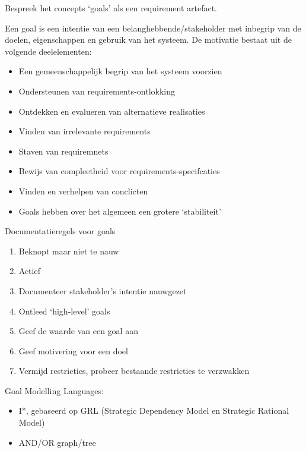 \documentclass{article}
\begin{document}
\begin{quest}{}Bespreek het concepts `goals' als een requirement artefact.\end{quest}
Een goal is een intentie van een belanghebbende/stakeholder met inbegrip van de doelen, eigenschappen en gebruik van het systeem. De motivatie bestaat uit de volgende deelelementen:
\begin{itemize}
    \item Een gemeenschappelijk begrip van het systeem voorzien
    \item Ondersteunen van requirements-ontlokking
    \item Ontdekken en evalueren van alternatieve realisaties
    \item Vinden van irrelevante requirements
    \item Staven van requiremnets
    \item Bewijs van compleetheid voor requirements-specifcaties
    \item Vinden en verhelpen van conclicten
    \item Goals hebben over het algemeen een grotere `stabiliteit'
\end{itemize}
Documentatieregels voor goals
\begin{enumerate}
    \item Beknopt maar niet te nauw
    \item Actief
    \item Documenteer stakeholder's intentie nauwgezet
    \item Ontleed `high-level' goals
    \item Geef de waarde van een goal aan
    \item Geef motivering voor een doel
    \item Vermijd restricties, probeer bestaande restricties te verzwakken
\end{enumerate}
Goal Modelling Languages:
\begin{itemize}
	\item I*, gebaseerd op GRL (Strategic Dependency Model en Strategic Rational Model)
	\item AND/OR graph/tree
\end{itemize}
\end{document}
